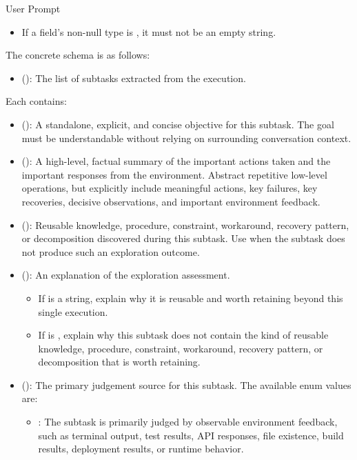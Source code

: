 \begin{svpromptbox}{User Prompt}
\begin{itemize}
\item If a field's non-null type is , it must not be an empty string.
\end{itemize}
\smallskip
The concrete schema is as follows:\par
\smallskip
\begin{itemize}
\item {} (): The list of subtasks extracted from the execution.
\end{itemize}
\smallskip
Each  contains:\par
\smallskip
\begin{itemize}
\item {} (): A standalone, explicit, and concise objective for this subtask. The goal must be understandable without relying on surrounding conversation context.
\item {} (): A high-level, factual summary of the important actions taken and the important responses from the environment. Abstract repetitive low-level operations, but explicitly include meaningful actions, key failures, key recoveries, decisive observations, and important environment feedback.
\item {} (): Reusable knowledge, procedure, constraint, workaround, recovery pattern, or decomposition discovered during this subtask. Use  when the subtask does not produce such an exploration outcome.
\item {} (): An explanation of the exploration assessment.
\begin{itemize}
\item If  is a string, explain why it is reusable and worth retaining beyond this single execution.
\item If  is , explain why this subtask does not contain the kind of reusable knowledge, procedure, constraint, workaround, recovery pattern, or decomposition that is worth retaining.
\end{itemize}
\item {} (): The primary judgement source for this subtask. The available enum values are:
\begin{itemize}
\item {}: The subtask is primarily judged by observable environment feedback, such as terminal output, test results, API responses, file existence, build results, deployment results, or runtime behavior.

\end{itemize}
\end{itemize}
\end{svpromptbox}
